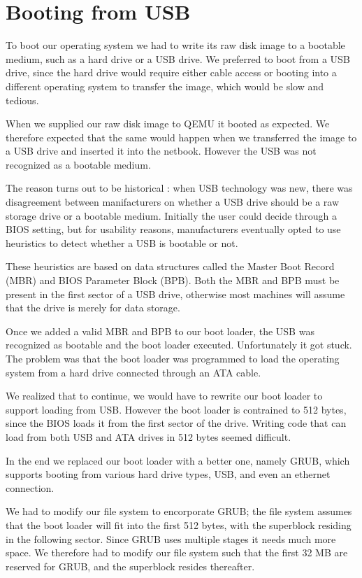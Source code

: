 \documentclass{report}
\begin{document}
\section{Booting from USB}
To boot our operating system we had to write its raw disk image to a bootable
medium, such as a hard drive or a USB drive. We preferred to boot from a USB
drive, since the hard drive would require either cable access or booting into
a different operating system to transfer the image, which would be slow and
tedious.

When we supplied our raw disk image to QEMU it booted as expected. We
therefore expected that the same would happen when we transferred the image to
a USB drive and inserted it into the netbook. However the USB was not
recognized as a bootable medium. 

The reason turns out to be historical \cite{bootingfromusb}: when USB
technology was new, there was disagreement between manifacturers on whether a
USB drive should be a raw storage drive or a bootable medium. Initially the
user could decide through a BIOS setting, but for usability reasons,
manufacturers eventually opted to use heuristics to detect whether a USB is
bootable or not. 

These heuristics are based on data structures called the Master Boot Record
(MBR) and BIOS Parameter Block (BPB). Both the MBR and BPB must be present in
the first sector of a USB drive, otherwise most machines will assume that the
drive is merely for data storage. 

Once we added a valid MBR and BPB to our boot loader, the USB was recognized
as bootable and the boot loader executed. Unfortunately it got stuck. The
problem was that the boot loader was programmed to load the operating system
from a hard drive connected through an ATA cable.

We realized that to continue, we would have to rewrite our boot loader to
support loading from USB. However the boot loader is contrained to 512 bytes,
since the BIOS loads it from the first sector of the drive. Writing code that
can load from both USB and ATA drives in 512 bytes seemed difficult.

In the end we replaced our boot loader with a better one, namely GRUB, which
supports booting from various hard drive types, USB, and even an ethernet
connection. 

We had to modify our file system to encorporate GRUB; the file system assumes
that the boot loader will fit into the first 512 bytes, with the superblock
residing in the following sector. Since GRUB uses multiple stages it needs
much more space. We therefore had to modify our file system such that the
first 32 MB are reserved for GRUB, and the superblock resides thereafter.
\end{document}
